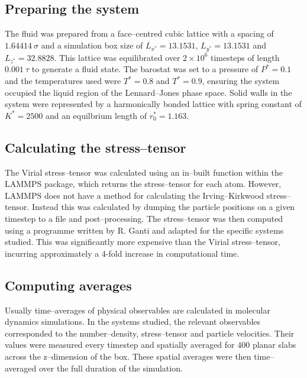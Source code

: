 \subsection{Preparing the system}\label{SystemPrep}
The fluid was prepared from a face--centred cubic lattice with a spacing of $1.64414\ \sigma$ and a simulation box size of $L_{x^{*}}=13.1531$, $L_{y^{*}}=13.1531$ and $L_{z^{*}}=32.8828$.
This lattice was equilibrated over $2\times 10^{6}$ timesteps of length $0.001\ \tau$ to generate a fluid state.
The barostat was set to a pressure of $P^{*} = 0.1$ and the temperatures used were $T^{*} = 0.8$ and $T^{*} = 0.9$, ensuring the system occupied the liquid region of the Lennard--Jones phase space.\cite{Smit}
Solid walls in the system were represented by a harmonically bonded lattice with spring constant of $K^{*} = 2500$ and an equilbrium length of $r^{*}_{0}=1.163$.

\subsection{Calculating the stress--tensor}\label{CalcStress}
The Virial stress--tensor was calculated using an in--built function within the LAMMPS package, which returns the stress--tensor for each atom.
However, LAMMPS does not have a method for calculating the Irving--Kirkwood stress--tensor.
Instead this was calculated by dumping the particle positions on a given timestep to a file and post--processing.
The stress--tensor was then computed using a programme written by R. Ganti and adapted for the specific systems studied.
This was significantly more expensive than the Virial stress--tensor, incurring approximately a 4-fold increase in computational time.

\subsection{Computing averages}\label{ComputeAve}
Usually time--averages of physical observables are calculated in molecular dynamics simulations. 
In the systems studied, the relevant observables corresponded to the number--density, stress--tensor and particle velocities.
Their values were measured every timestep and spatially averaged for $400$ planar slabs across the z--dimension of the box.
These spatial averages were then time--averaged over the full duration of the simulation.

